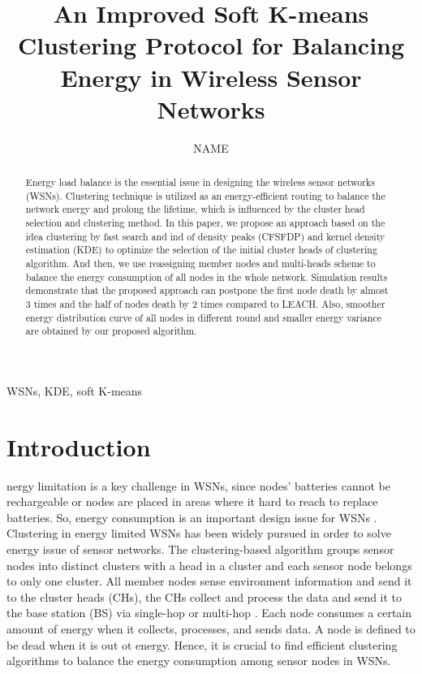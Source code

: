 \documentclass[journal,twoside,web]{ieeecolor}
\begin{document}
	\title{An Improved Soft K-means Clustering Protocol for Balancing Energy in Wireless Sensor Networks}
	\author{NAME}

\maketitle
\begin{abstract}
	 Energy load balance is the essential issue in designing the wireless sensor networks (WSNs). Clustering technique is utilized as an energy-efficient routing to balance the network energy and prolong the lifetime, which is influenced by the cluster head selection and clustering method. In this paper, we propose an approach based on the idea clustering by fast search and ind of density peaks (CFSFDP) and kernel density estimation (KDE) to optimize the selection of the initial cluster heads of clustering algorithm. And then, we use reassigning member nodes and multi-heads scheme to balance the energy consumption of all nodes in the whole network. Simulation results demonstrate that the proposed approach can postpone the first node death by almost 3 times and the half of nodes death by 2 times compared to LEACH. Also, smoother energy distribution curve of all nodes in different round and smaller energy variance are obtained by our proposed algorithm.
\end{abstract}

\begin{IEEEkeywords}
	WSNs, KDE, soft K-means
\end{IEEEkeywords}

\section{Introduction}
\label{sec:introduction}
nergy limitation is a key challenge in WSNs, since nodes' batteries cannot be rechargeable or nodes are placed in areas where it hard to reach to replace batteries. So, energy consumption is an important design issue for WSNs \cite{b1}. Clustering in energy limited WSNs has been widely pursued in order to solve energy issue of sensor networks. The clustering-based algorithm groups sensor nodes into distinct clusters with a head in a cluster and each sensor node belongs to only one cluster. All member nodes sense environment information and send it to the cluster heads (CHs), the CHs collect and process the data and send it to the base station (BS) via single-hop or multi-hop \cite{b2}. Each node consumes a certain amount of energy when it collects, processes, and sends data. A node is defined to be dead when it is out ot energy\cite{b3}. Hence, it is crucial to find efficient clustering algorithms to balance the energy consumption among sensor nodes in WSNs.
\end{document}
